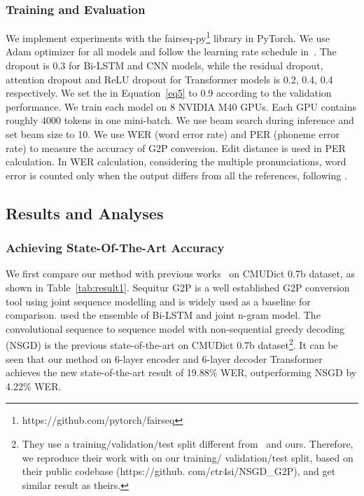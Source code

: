 \documentclass[a4paper]{article}
\begin{document}
\subsubsection{Training and Evaluation}
We implement experiments with the fairseq-py\footnote{https://github.com/pytorch/fairseq} library in PyTorch. We use Adam optimizer for all models and follow the learning rate schedule in~\cite{vaswani2017attention}. The dropout is 0.3 for Bi-LSTM and CNN models, while the residual dropout, attention dropout and ReLU dropout for Transformer models is 0.2, 0.4, 0.4 respectively. We set the  in Equation~\ref{eq5} to 0.9 according to the validation performance. We train each model on 8 NVIDIA M40 GPUs. Each GPU contains roughly 4000 tokens in one mini-batch. We use beam search during inference and set beam size to 10. We use WER (word error rate) and PER (phoneme error rate) to measure the accuracy of G2P conversion. Edit distance is used in PER calculation. In WER calculation, considering the multiple pronunciations, word error is counted only when the output differs from all the references, following \cite{bisani2008joint,chae2018convolutional,milde2017multitask,rao2015grapheme}.





\subsection{Results and Analyses}
\subsubsection{Achieving State-Of-The-Art Accuracy}
We first compare our method with previous works~\cite{bisani2008joint,chae2018convolutional,milde2017multitask} on CMUDict 0.7b dataset, as shown in Table~\ref{tab:result1}. Sequitur G2P \cite{bisani2008joint} is a well established G2P conversion tool using joint sequence modelling and is widely used as a baseline for comparison. \cite{milde2017multitask} used the ensemble of Bi-LSTM and joint n-gram model. The convolutional sequence to sequence model with non-sequential greedy decoding (NSGD) \cite{chae2018convolutional} is the previous state-of-the-art on CMUDict 0.7b dataset\footnote{They use a training/validation/test split different from~\cite{milde2017multitask} and ours. Therefore, we reproduce their work with on our training/ validation/test split, based on their public codebase (https://github. com/ctr4si/NSGD\_G2P), and get similar result as theirs.}. It can be seen that our method on 6-layer encoder and 6-layer decoder Transformer achieves the new state-of-the-art result of 19.88\% WER, outperforming NSGD by 4.22\% WER. 
\end{document}
